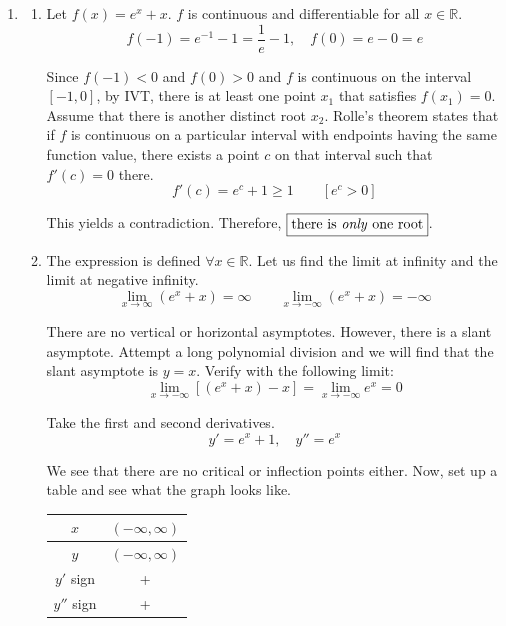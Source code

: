 \documentclass[a4paper, 12pt]{article}
\begin{document}
\begin{enumerate}[leftmargin=*,label=\textbf{\arabic*.}]
\[\boxed{a'(t_0) = -\frac12\,\text{cm/h}}\]
\newpage

\item \begin{enumerate}[leftmargin=*,label=\textbf{\alph*.}]
\item Let $f(x) =  e^x + x$. $f$ is continuous and differentiable for all $x\in\mathbb{R}$.
\[f(-1)= e^{-1}-1=\frac1{ e}-1,\quad f(0)= e-0= e\]

Since $f(-1) < 0$ and $f(0) > 0$ and $f$ is continuous on the interval $[-1, 0]$, by IVT, there is at least one point $x_1$ that satisfies $f(x_1) = 0$. Assume that there is another distinct root $x_2$. Rolle's theorem states that if $f$ is continuous on a particular interval with endpoints having the same function value, there exists a point $c$ on that interval such that $f'(c) = 0$ there.
\[f'(c)= e^c+1\geq1\qquad\left[ e^c>0\right]\]

This yields a contradiction. Therefore, $\boxed{\text{there is \textit{only} one root}}$.

\item The expression is defined $\forall x\in\mathbb{R}$. Let us find the limit at infinity and the limit at negative infinity.
\[\lim_{x\to\infty}\left( e^x+x\right)=\infty\qquad\lim_{x\to-\infty}\left( e^x+x\right)=-\infty\]

There are no vertical or horizontal asymptotes. However, there is a slant asymptote. Attempt a long polynomial division and we will find that the slant asymptote is $y=x$. Verify with the following limit:
\[\lim_{x\to-\infty}\left[\left( e^x+x\right)-x\right]=\lim_{x\to-\infty} e^x=0\]

Take the first and second derivatives.
\[y'= e^x+1,\quad y''= e^x\]

We see that there are no critical or inflection points either. Now, set up a table and see what the graph looks like.
\begin{center}
    \begin{tabular}{ |c| c| } 
    \hline
        $x$ & $(-\infty, \infty)$\\
        \hline
        $y$ & $(-\infty, \infty)$\\
        \hline
        $y'$ sign & + \\
        \hline
        $y''$ sign & + \\
        \hline
    \end{tabular}
\end{center}

\begin{center}
\end{center}
\end{enumerate}
\end{enumerate}
\end{document}
